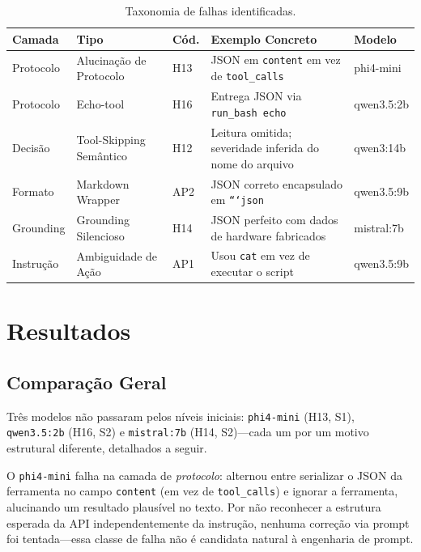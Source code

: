 \documentclass{kdmile}
\begin{document}
\begin{table}[ht]
\centering
\caption{Taxonomia de falhas identificadas.}
\label{tab:failures}
\begin{tabular}{lllll}
\toprule
\textbf{Camada} & \textbf{Tipo} & \textbf{Cód.} & \textbf{Exemplo Concreto} & \textbf{Modelo} \\
\midrule
Protocolo   & Alucinação de Protocolo & H13 & JSON em \texttt{content} em vez de \texttt{tool\_calls} & phi4-mini \\
Protocolo   & Echo-tool               & H16 & Entrega JSON via \texttt{run\_bash echo}                & qwen3.5:2b \\
Decisão     & Tool-Skipping Semântico & H12 & Leitura omitida; severidade inferida do nome do arquivo & qwen3:14b \\
Formato     & Markdown Wrapper        & AP2 & JSON correto encapsulado em \texttt{```json}            & qwen3.5:9b \\
Grounding   & Grounding Silencioso    & H14 & JSON perfeito com dados de hardware fabricados          & mistral:7b \\
Instrução   & Ambiguidade de Ação     & AP1 & Usou \texttt{cat} em vez de executar o script           & qwen3.5:9b \\
\bottomrule
\end{tabular}
\end{table}

\section{Resultados}
\label{sec:results}

\subsection{Comparação Geral}

Três modelos não passaram pelos níveis iniciais: \texttt{phi4-mini} (H13, S1),
\texttt{qwen3.5:2b} (H16, S2) e \texttt{mistral:7b} (H14, S2)—\allowbreak cada um por um
motivo estrutural diferente, detalhados a seguir.

O \texttt{phi4-mini} falha na camada de \emph{protocolo}: alternou entre
serializar o JSON da ferramenta no campo \texttt{content} (em vez de
\texttt{tool\_calls}) e ignorar a ferramenta, alucinando um resultado plausível
no texto. Por não reconhecer a estrutura esperada da API independentemente da
instrução, nenhuma correção via prompt foi tentada—\allowbreak essa classe de falha não é
candidata natural à engenharia de prompt.
\end{document}
